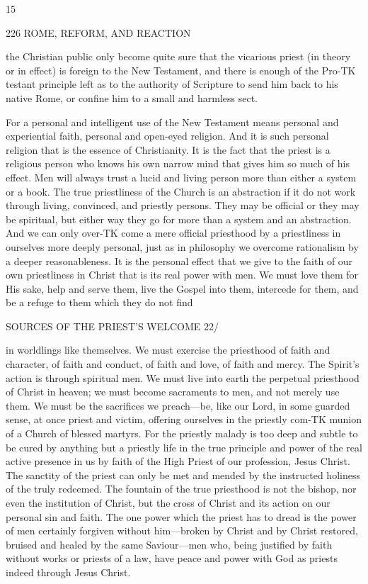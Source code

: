 \documentclass[12pt,a5paper,oneside]{book}
\begin{document}
{{15 



226 ROME, REFORM, AND REACTION 

the Christian public only become quite sure that the 
vicarious priest (in theory or in effect) is foreign to the 
New Testament, and there is enough of the Pro-TK
testant principle left as to the authority of Scripture 
to send him back to his native Rome, or confine him 
to a small and harmless sect. 

For a personal and intelligent use of the New 
Testament means personal and experiential faith, 
personal and open-eyed religion. And it is such 
personal religion that is the essence of Christianity. 
It is the fact that the priest is a religious person who 
knows his own narrow mind that gives him so much 
of his effect. Men will always trust a lucid and living 
person more than either a system or a book. The 
true priestliness of the Church is an abstraction if it 
do not work through living, convinced, and priestly 
persons. They may be official or they may be 
spiritual, but either way they go for more than a 
system and an abstraction. And we can only over-TK
come a mere official priesthood by a priestliness in 
ourselves more deeply personal, just as in philosophy 
we overcome rationalism by a deeper reasonableness. 
It is the personal effect that we give to the faith of our 
own priestliness in Christ that is its real power with 
men. We must love them for His sake, help and 
serve them, live the Gospel into them, intercede for 
them, and be a refuge to them which they do not find 



SOURCES OF THE PRIEST'S WELCOME 22/ 

in worldlings like themselves. We must exercise the 
priesthood of faith and character, of faith and conduct, 
of faith and love, of faith and mercy. The Spirit's 
action is through spiritual men. We must live into 
earth the perpetual priesthood of Christ in heaven; 
we must become sacraments to men, and not merely 
use them. We must be the sacrifices we preach---be, 
like our Lord, in some guarded sense, at once priest 
and victim, offering ourselves in the priestly com-TK
munion of a Church of blessed martyrs. For the 
priestly malady is too deep and subtle to be cured by 
anything but a priestly life in the true principle and 
power of the real active presence in us by faith of the 
High Priest of our profession, Jesus Christ. The 
sanctity of the priest can only be met and mended 
by the instructed holiness of the truly redeemed. 
The fountain of the true priesthood is not the bishop, 
nor even the institution of Christ, but the cross of 
Christ and its action on our personal sin and faith. 
The one power which the priest has to dread is the 
power of men certainly forgiven without him---broken 
by Christ and by Christ restored, bruised and healed 
by the same Saviour---men who, being justified by 
faith without works or priests of a law, have peace 
and power with God as priests indeed through Jesus 
Christ. 



}}
\end{document}
